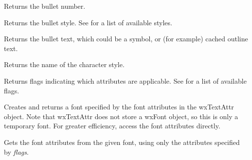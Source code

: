 \label{wxtextattrgetbulletnumber}


Returns the bullet number.

\label{wxtextattrgetbulletstyle}


Returns the bullet style.
See  for a list of available styles.

\label{wxtextattrgetbullettext}


Returns the bullet text, which could be a symbol, or (for example) cached outline text.

\label{wxtextattrgetcharacterstylename}


Returns the name of the character style.

\label{wxtextattrgetflags}


Returns flags indicating which attributes are applicable.
See  for a list of available flags.

\label{wxtextattrgetfont}


Creates and returns a font specified by the font attributes in the wxTextAttr object. Note that
wxTextAttr does not store a wxFont object, so this is only a temporary font. For greater
efficiency, access the font attributes directly.

\label{wxtextattrgetfontattributes}


Gets the font attributes from the given font, using only the attributes specified by {\it flags}.

\label{wxtextattrgetfontencoding}

